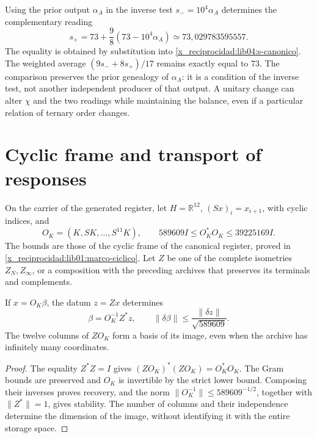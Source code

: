Using the prior output \(\alpha_A\) in the inverse test
\(s_-=10^4\alpha_A\) determines the complementary reading
\begin{equation}
 s_+=73+\frac98(73-10^4\alpha_A)
       \simeq73{,}029783595557.
 \label{x_reciprocidad:lib04:ensayo-alpha}
\end{equation}
The equality is obtained by substitution into
\eqref{x_reciprocidad:lib04:s-canonico}. The weighted average
\((9s_-+8s_+)/17\) remains exactly equal to \(73\).
The comparison preserves the prior genealogy of \(\alpha_A\): it is
a condition of the inverse test, not another independent producer of
that output. A unitary change can alter \(\chi\) and the two
readings while maintaining the balance, even if a particular relation
of ternary order changes.

\section{Cyclic frame and transport of responses}
\label{x_reciprocidad:lib04:marco}

On the carrier of the generated register, let
\(H=\mathbb R^{12}\), \((Sx)_i=x_{i+1}\), with cyclic indices,
and
\begin{equation}
 O_K=(K,SK,\ldots,S^{11}K),\qquad
 589609I\leq O_K^*O_K\leq39225169I.
 \label{x_reciprocidad:lib04:gram-k}
\end{equation}
The bounds are those of the cyclic frame of the canonical register,
proved in \cref{x_reciprocidad:lib01:marco-ciclico}.
Let \(Z\) be one of the complete isometries
\(Z_N,Z_\infty\), or a composition with the preceding archives
that preserves its terminals and complements.

\begin{theorem}
\label{x_reciprocidad:lib04:teo-marco}
If \(x=O_K\beta\), the datum \(z=Zx\) determines
\begin{equation}
 \beta=O_K^{-1}Z^*z,\qquad
 \|\delta\beta\|\leq\frac{\|\delta z\|}{\sqrt{589609}}.
 \label{x_reciprocidad:lib04:inversa-marco}
\end{equation}
The twelve columns of \(ZO_K\) form a basis of its image, even
when the archive has infinitely many coordinates.
\end{theorem}

\begin{proof}
The equality \(Z^*Z=I\) gives
\((ZO_K)^*(ZO_K)=O_K^*O_K\). The Gram bounds are preserved and
\(O_K\) is invertible by the strict lower bound. Composing their
inverses proves recovery, and the norm
\(\|O_K^{-1}\|\leq589609^{-1/2}\), together with
\(\|Z^*\|=1\), gives stability. The number of columns and their
independence determine the dimension of the image, without identifying it
with the entire storage space.
\end{proof}

